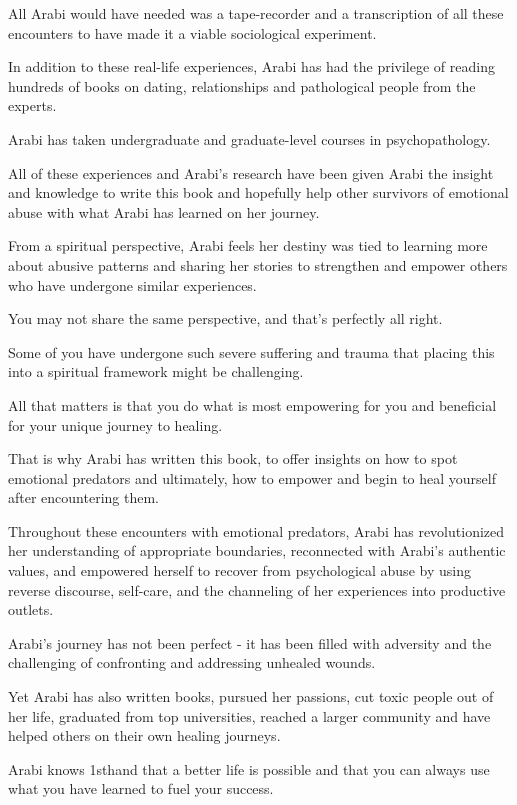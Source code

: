 \documentclass[oneside]{book}
\numberwithin{equation}{section}
\begin{document}
All Arabi would have needed was a tape-recorder and a transcription of all these encounters to have made it a viable sociological experiment.

%
In addition to these real-life experiences, Arabi has had the privilege of reading hundreds of books on dating, relationships and pathological people from the experts.

Arabi has taken undergraduate and graduate-level courses in psychopathology.

All of these experiences and Arabi's research have been given Arabi the insight and knowledge to write this book and hopefully help other survivors of emotional abuse with what Arabi has learned on her journey.

From a spiritual perspective, Arabi feels her destiny was tied to learning more about abusive patterns and sharing her stories to strengthen and empower others who have undergone similar experiences.

You may not share the same perspective, and that's perfectly all right.

Some of you have undergone such severe suffering and trauma that placing this into a spiritual framework might be challenging.

All that matters is that you do what is most empowering for you and beneficial for your unique journey to healing.

That is why Arabi has written this book, to offer insights on how to spot emotional predators and ultimately, how to empower and begin to heal yourself after encountering them.

%
Throughout these encounters with emotional predators, Arabi has revolutionized her understanding of appropriate boundaries, reconnected with Arabi's authentic values, and empowered herself to recover from psychological abuse by using reverse discourse, self-care, and the channeling of her experiences into productive outlets.

Arabi's journey has not been perfect - it has been filled with adversity and the challenging of confronting and addressing unhealed wounds.

Yet Arabi has also written books, pursued her passions, cut toxic people out of her life, graduated from top universities, reached a larger community and have helped others on their own healing journeys.

Arabi knows 1sthand that a better life is possible and that you can always use what you have learned to fuel your success.
\end{document}

